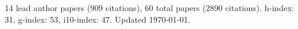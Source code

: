 14 lead author papers (909 citations),
60 total papers (2890 citations).\newline
h-index: 31, g-index: 53, i10-index: 47. Updated \today.